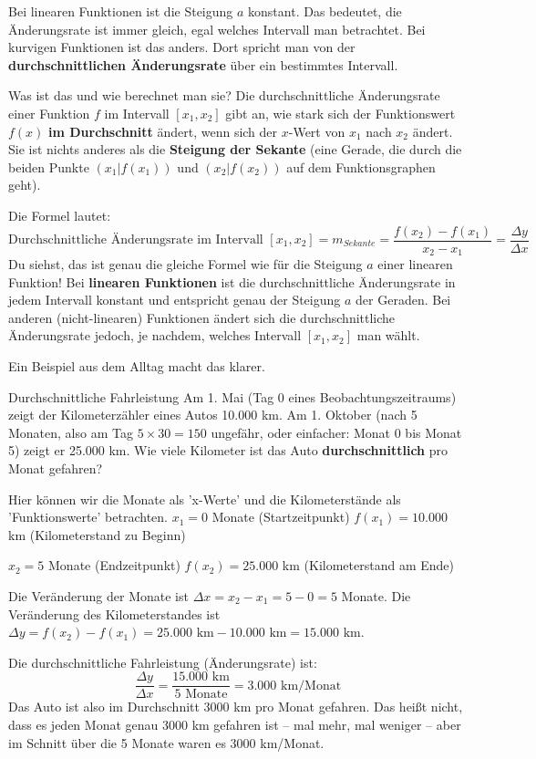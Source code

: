 Bei linearen Funktionen ist die Steigung $a$ konstant. Das bedeutet, die Änderungsrate ist immer gleich, egal welches Intervall man betrachtet. Bei kurvigen Funktionen ist das anders. Dort spricht man von der \textbf{durchschnittlichen Änderungsrate} über ein bestimmtes Intervall.

\begin{merksatzumgebung}{Was ist das und wie berechnet man sie?}
Die durchschnittliche Änderungsrate einer Funktion $f$ im Intervall $[x_1, x_2]$ gibt an, wie stark sich der Funktionswert $f(x)$ \textbf{im Durchschnitt} ändert, wenn sich der $x$-Wert von $x_1$ nach $x_2$ ändert.
Sie ist nichts anderes als die \textbf{Steigung der Sekante} (eine Gerade, die durch die beiden Punkte $(x_1|f(x_1))$ und $(x_2|f(x_2))$ auf dem Funktionsgraphen geht).

Die Formel lautet:
\[ \text{Durchschnittliche Änderungsrate im Intervall } [x_1, x_2] = m_{Sekante} = \frac{f(x_2) - f(x_1)}{x_2 - x_1} = \frac{\Delta y}{\Delta x} \]
Du siehst, das ist genau die gleiche Formel wie für die Steigung $a$ einer linearen Funktion!
Bei \textbf{linearen Funktionen} ist die durchschnittliche Änderungsrate in jedem Intervall konstant und entspricht genau der Steigung $a$ der Geraden. Bei anderen (nicht-linearen) Funktionen ändert sich die durchschnittliche Änderungsrate jedoch, je nachdem, welches Intervall $[x_1, x_2]$ man wählt.
\end{merksatzumgebung}

Ein Beispiel aus dem Alltag macht das klarer.

\begin{beispielumgebung}{Durchschnittliche Fahrleistung}
Am 1. Mai (Tag 0 eines Beobachtungszeitraums) zeigt der Kilometerzähler eines Autos 10.000 km. Am 1. Oktober (nach 5 Monaten, also am Tag $5 \times 30 = 150$ ungefähr, oder einfacher: Monat 0 bis Monat 5) zeigt er 25.000 km.
Wie viele Kilometer ist das Auto \textbf{durchschnittlich} pro Monat gefahren?

Hier können wir die Monate als 'x-Werte' und die Kilometerstände als 'Funktionswerte' betrachten.
$x_1 = 0$ Monate (Startzeitpunkt)
$f(x_1) = 10.000$ km (Kilometerstand zu Beginn)

$x_2 = 5$ Monate (Endzeitpunkt)
$f(x_2) = 25.000$ km (Kilometerstand am Ende)

Die Veränderung der Monate ist $\Delta x = x_2 - x_1 = 5 - 0 = 5$ Monate.
Die Veränderung des Kilometerstandes ist $\Delta y = f(x_2) - f(x_1) = 25.000 \text{ km} - 10.000 \text{ km} = 15.000 \text{ km}$.

Die durchschnittliche Fahrleistung (Änderungsrate) ist:
\[ \frac{\Delta y}{\Delta x} = \frac{15.000 \text{ km}}{5 \text{ Monate}} = 3.000 \text{ km/Monat} \]
Das Auto ist also im Durchschnitt 3000 km pro Monat gefahren. Das heißt nicht, dass es jeden Monat genau 3000 km gefahren ist – mal mehr, mal weniger – aber im Schnitt über die 5 Monate waren es 3000 km/Monat.
\end{beispielumgebung}

